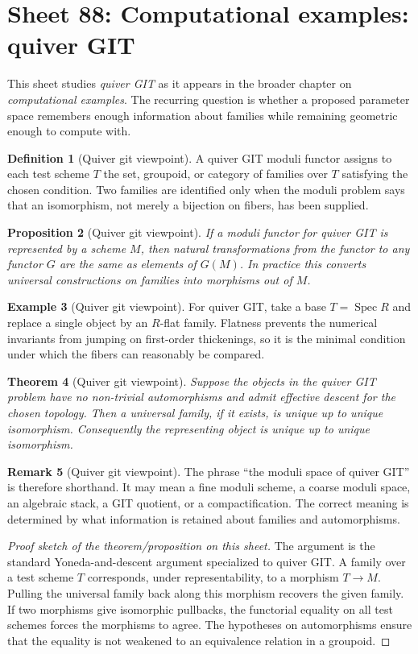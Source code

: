 \documentclass[11pt]{amsart}
\newtheorem{theorem}{Theorem}[section]
\newtheorem{proposition}[theorem]{Proposition}
\theoremstyle{definition}
\newtheorem{definition}[theorem]{Definition}
\newtheorem{example}[theorem]{Example}
\newtheorem{remark}[theorem]{Remark}
\newcommand{\Spec}{\operatorname{Spec}}
\begin{document}
\section{Sheet 88: Computational examples: quiver GIT}
This sheet studies \emph{quiver GIT} as it appears in the broader chapter on \emph{computational examples}.  The recurring question is whether a proposed parameter space remembers enough information about families while remaining geometric enough to compute with.
\begin{definition}[Quiver git viewpoint]
A quiver GIT moduli functor assigns to each test scheme $T$ the set, groupoid, or category of families over $T$ satisfying the chosen condition.  Two families are identified only when the moduli problem says that an isomorphism, not merely a bijection on fibers, has been supplied.
\end{definition}
\begin{proposition}[Quiver git viewpoint]
If a moduli functor for quiver GIT is represented by a scheme $M$, then natural transformations from the functor to any functor $G$ are the same as elements of $G(M)$.  In practice this converts universal constructions on families into morphisms out of $M$.
\end{proposition}
\begin{example}[Quiver git viewpoint]
For quiver GIT, take a base $T=\Spec R$ and replace a single object by an $R$-flat family.  Flatness prevents the numerical invariants from jumping on first-order thickenings, so it is the minimal condition under which the fibers can reasonably be compared.
\end{example}
\begin{theorem}[Quiver git viewpoint]
Suppose the objects in the quiver GIT problem have no non-trivial automorphisms and admit effective descent for the chosen topology.  Then a universal family, if it exists, is unique up to unique isomorphism.  Consequently the representing object is unique up to unique isomorphism.
\end{theorem}
\begin{remark}[Quiver git viewpoint]
The phrase ``the moduli space of quiver GIT'' is therefore shorthand.  It may mean a fine moduli scheme, a coarse moduli space, an algebraic stack, a GIT quotient, or a compactification.  The correct meaning is determined by what information is retained about families and automorphisms.
\end{remark}
\begin{proof}[Proof sketch of the theorem/proposition on this sheet]
The argument is the standard Yoneda-and-descent argument specialized to quiver GIT.  A family over a test scheme $T$ corresponds, under representability, to a morphism $T\to M$.  Pulling the universal family back along this morphism recovers the given family.  If two morphisms give isomorphic pullbacks, the functorial equality on all test schemes forces the morphisms to agree.  The hypotheses on automorphisms ensure that the equality is not weakened to an equivalence relation in a groupoid.
\end{proof}
\end{document}
